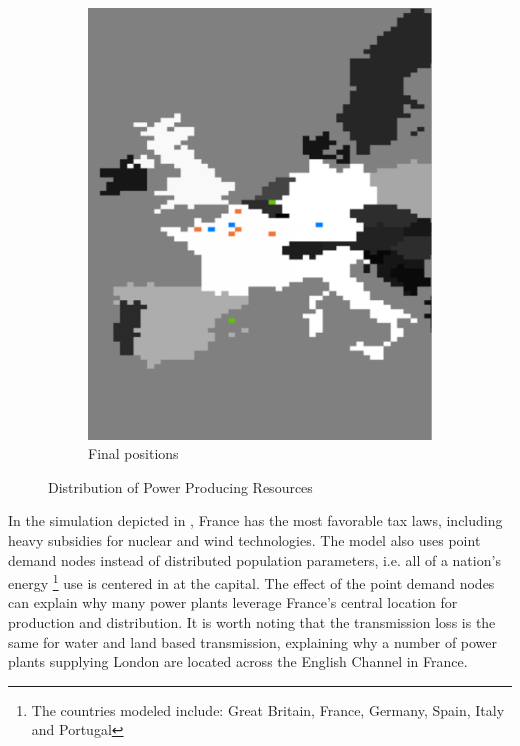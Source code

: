 \documentclass[12pt]{article}
\begin{document}
\begin{figure}[ht!]
	\begin{subfigure}{.5\textwidth}
		\centering
		\includegraphics[scale=.4]{movement_after.png}
		\caption{Final positions}

	\end{subfigure}

	\caption{Distribution of Power Producing Resources}
	\label{georesults}
\end{figure}

In the simulation depicted in , France has the most favorable tax laws, including heavy subsidies for nuclear and wind technologies. The model also uses point demand nodes instead of distributed population parameters, i.e. all of a nation's energy \footnote{The countries modeled include: Great Britain, France, Germany, Spain, Italy and Portugal} use is centered in at the capital. The effect of the point demand nodes can explain why many power plants leverage France's central location for production and distribution. It is worth noting that the transmission loss is the same for water and land based transmission, explaining why a number of power plants supplying London are located across the English Channel in France. \
\end{document}
